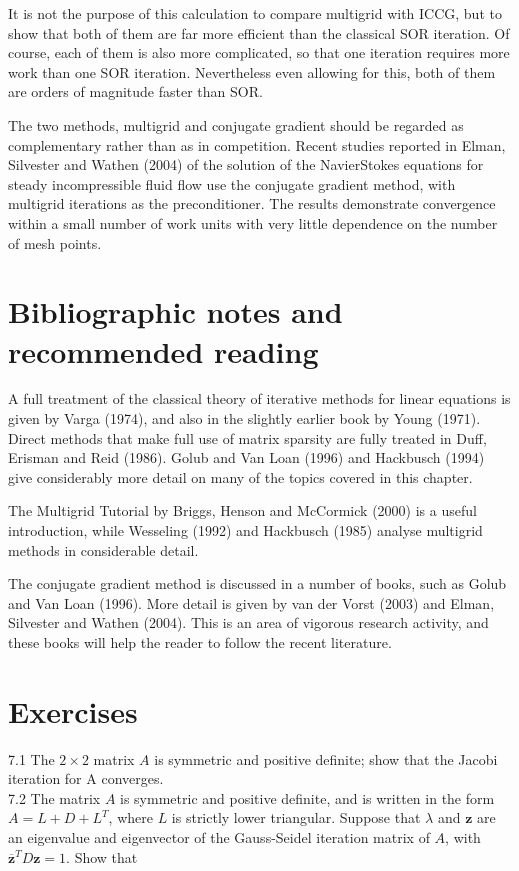 \documentclass[10pt]{article}
\begin{document}
It is not the purpose of this calculation to compare multigrid with ICCG, but to show that both of them are far more efficient than the classical SOR iteration. Of course, each of them is also more complicated, so that one iteration requires more work than one SOR iteration. Nevertheless even allowing for this, both of them are orders of magnitude faster than SOR.

The two methods, multigrid and conjugate gradient should be regarded as complementary rather than as in competition. Recent studies reported in Elman, Silvester and Wathen (2004) of the solution of the NavierStokes equations for steady incompressible fluid flow use the conjugate gradient method, with multigrid iterations as the preconditioner. The results demonstrate convergence within a small number of work units with very little dependence on the number of mesh points.

\section*{Bibliographic notes and recommended reading}
A full treatment of the classical theory of iterative methods for linear equations is given by Varga (1974), and also in the slightly earlier book by Young (1971). Direct methods that make full use of matrix sparsity are fully treated in Duff, Erisman and Reid (1986). Golub and Van Loan (1996) and Hackbusch (1994) give considerably more detail on many of the topics covered in this chapter.

The Multigrid Tutorial by Briggs, Henson and McCormick (2000) is a useful introduction, while Wesseling (1992) and Hackbusch (1985) analyse multigrid methods in considerable detail.

The conjugate gradient method is discussed in a number of books, such as Golub and Van Loan (1996). More detail is given by van der Vorst (2003) and Elman, Silvester and Wathen (2004). This is an area of vigorous research activity, and these books will help the reader to follow the recent literature.

\section*{Exercises}
7.1 The \(2 \times 2\) matrix \(A\) is symmetric and positive definite; show that the Jacobi iteration for A converges.\\
7.2 The matrix \(A\) is symmetric and positive definite, and is written in the form \(A=L+D+L^{T}\), where \(L\) is strictly lower triangular. Suppose that \(\lambda\) and \(\mathbf{z}\) are an eigenvalue and eigenvector of the Gauss-Seidel iteration matrix of \(A\), with \(\overline{\mathbf{z}}^{T} D \mathbf{z}=1\). Show that
\end{document}
